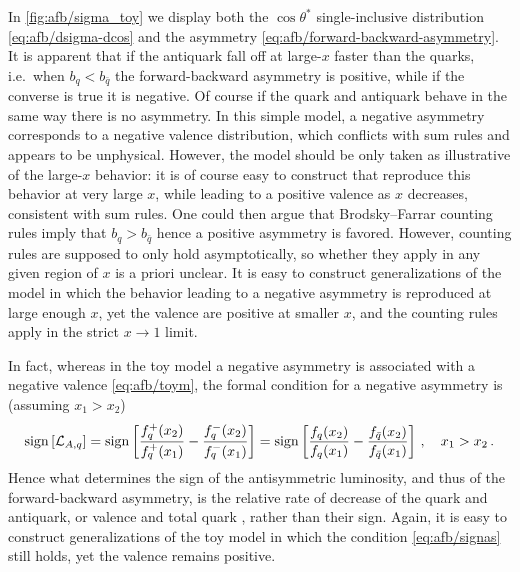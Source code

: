In \cref{fig:afb/sigma_toy} we display both the $\cos\theta^*$ single-inclusive
distribution \cref{eq:afb/dsigma-dcos} and the asymmetry
\cref{eq:afb/forward-backward-asymmetry}.
%
It is apparent that if the  antiquark \pdfs fall off at large-$x$ faster than
the quarks, i.e.\ when $b_q < b_{\bar{q}}$ the forward-backward asymmetry is
positive, while if the converse is true it is negative.
Of course if the quark and antiquark \pdfs behave in the same way there is no
asymmetry.
%
In this simple model, a negative asymmetry corresponds to a negative valence
distribution, which conflicts with sum rules and appears to be unphysical.
However, the model should be only taken as illustrative of the large-$x$
behavior: it is of course easy to construct \pdfs that reproduce this behavior
at very large $x$, while leading to a positive valence \pdf as $x$ decreases,
consistent with sum rules. 
One could then argue that Brodsky--Farrar counting rules
\cite{Brodsky:1973kr,Brodsky:1974vy} imply that  $b_q > b_{\bar{q}}$ hence a
positive asymmetry is favored.
%
However, counting rules are supposed to only hold asymptotically, so whether
they apply in any given region of $x$ is a priori unclear.
%
It is easy to construct generalizations of the model in which the behavior
leading to a negative asymmetry is reproduced at large enough $x$, yet the
valence \pdfs are positive at smaller $x$, and the counting rules apply in the
strict $x\to1$ limit.

In fact, whereas in the toy model a negative asymmetry is associated with a
negative valence \cref{eq:afb/toym}, the formal condition for a negative
asymmetry is (assuming $x_1>x_2$)
\begin{equation}\label{eq:afb/signas}
   \operatorname{sign}\left[\mathcal{L}_{A,q}\right]=\operatorname{sign}\left[\frac{ f_q^+(x_2)}{
       f_q^+(x_1)}-\frac{
       f_q^-(x_2)}{f_q^-(x_1)}\right]=\operatorname{sign}\left[\frac{ f_q(x_2)}{
       f_q(x_1)}-\frac{f_{\bar{q}}(x_2)}{f_{\bar{q}}(x_1)}\right] \, , \quad x_1>x_2 \,.
\end{equation}
Hence what determines the sign of the antisymmetric luminosity, and thus of the
forward-backward asymmetry, is the relative rate of decrease of the quark and
antiquark, or valence and total quark \pdfs, rather than their sign.
Again, it is easy to construct generalizations of the toy model in which the
condition \cref{eq:afb/signas} still holds, yet the valence \pdf remains
positive.

